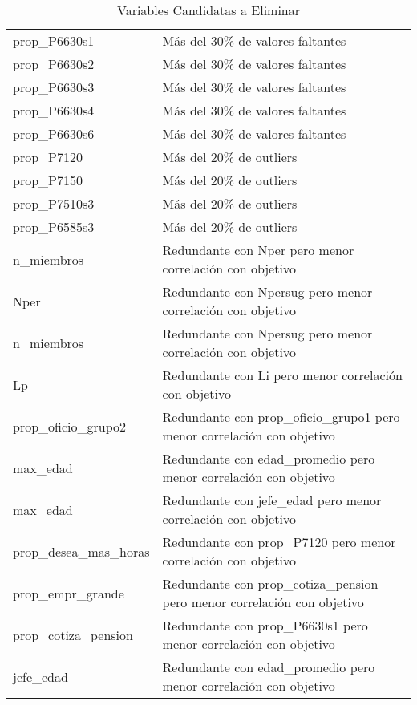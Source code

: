 \begin{table}[ht]
\begin{tabular}{ll}
  prop\_P6630s1 & Más del 30\% de valores faltantes \\ 
  prop\_P6630s2 & Más del 30\% de valores faltantes \\ 
  prop\_P6630s3 & Más del 30\% de valores faltantes \\ 
  prop\_P6630s4 & Más del 30\% de valores faltantes \\ 
  prop\_P6630s6 & Más del 30\% de valores faltantes \\ 
  prop\_P7120 & Más del 20\% de outliers \\ 
  prop\_P7150 & Más del 20\% de outliers \\ 
  prop\_P7510s3 & Más del 20\% de outliers \\ 
  prop\_P6585s3 & Más del 20\% de outliers \\ 
  n\_miembros & Redundante con Nper pero menor correlación con objetivo \\ 
  Nper & Redundante con Npersug pero menor correlación con objetivo \\ 
  n\_miembros & Redundante con Npersug pero menor correlación con objetivo \\ 
  Lp & Redundante con Li pero menor correlación con objetivo \\ 
  prop\_oficio\_grupo2 & Redundante con prop\_oficio\_grupo1 pero menor correlación con objetivo \\ 
  max\_edad & Redundante con edad\_promedio pero menor correlación con objetivo \\ 
  max\_edad & Redundante con jefe\_edad pero menor correlación con objetivo \\ 
  prop\_desea\_mas\_horas & Redundante con prop\_P7120 pero menor correlación con objetivo \\ 
  prop\_empr\_grande & Redundante con prop\_cotiza\_pension pero menor correlación con objetivo \\ 
  prop\_cotiza\_pension & Redundante con prop\_P6630s1 pero menor correlación con objetivo \\ 
  jefe\_edad & Redundante con edad\_promedio pero menor correlación con objetivo \\ 
   \bottomrule
\end{tabular}
\caption{Variables Candidatas a Eliminar} 
\label{tab:variables_eliminar}
\end{table}
